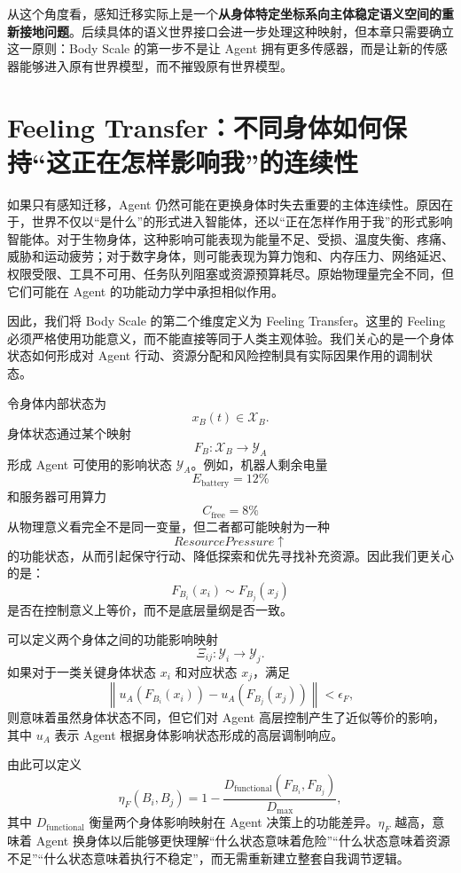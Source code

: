 从这个角度看，感知迁移实际上是一个\textbf{从身体特定坐标系向主体稳定语义空间的重新接地问题}。后续具体的语义世界接口会进一步处理这种映射，但本章只需要确立这一原则：Body Scale 的第一步不是让 Agent 拥有更多传感器，而是让新的传感器能够进入原有世界模型，而不摧毁原有世界模型。


\section{Feeling Transfer：不同身体如何保持“这正在怎样影响我”的连续性}

如果只有感知迁移，Agent 仍然可能在更换身体时失去重要的主体连续性。原因在于，世界不仅以“是什么”的形式进入智能体，还以“正在怎样作用于我”的形式影响智能体。对于生物身体，这种影响可能表现为能量不足、受损、温度失衡、疼痛、威胁和运动疲劳；对于数字身体，则可能表现为算力饱和、内存压力、网络延迟、权限受限、工具不可用、任务队列阻塞或资源预算耗尽。原始物理量完全不同，但它们可能在 Agent 的功能动力学中承担相似作用。

因此，我们将 Body Scale 的第二个维度定义为 Feeling Transfer。这里的 Feeling 必须严格使用功能意义，而不能直接等同于人类主观体验。我们关心的是一个身体状态如何形成对 Agent 行动、资源分配和风险控制具有实际因果作用的调制状态。

令身体内部状态为
\[
x_B(t)\in\mathcal X_B.
\]
身体状态通过某个映射
\[
F_B:
\mathcal X_B
\rightarrow
\mathcal Y_A
\]
形成 Agent 可使用的影响状态 $\mathcal Y_A$。例如，机器人剩余电量
\[
E_{\mathrm{battery}}=12\%
\]
和服务器可用算力
\[
C_{\mathrm{free}}=8\%
\]
从物理意义看完全不是同一变量，但二者都可能映射为一种
\[
ResourcePressure\uparrow
\]
的功能状态，从而引起保守行动、降低探索和优先寻找补充资源。因此我们更关心的是：
\[
F_{B_i}(x_i)
\sim
F_{B_j}(x_j)
\]
是否在控制意义上等价，而不是底层量纲是否一致。

可以定义两个身体之间的功能影响映射
\[
\Xi_{ij}:
\mathcal Y_i\rightarrow\mathcal Y_j.
\]
如果对于一类关键身体状态 $x_i$ 和对应状态 $x_j$，满足
\[
\left\|
u_A(F_{B_i}(x_i))
-
u_A(F_{B_j}(x_j))
\right\|
<
\epsilon_F,
\]
则意味着虽然身体状态不同，但它们对 Agent 高层控制产生了近似等价的影响，其中 $u_A$ 表示 Agent 根据身体影响状态形成的高层调制响应。

由此可以定义
\[
\eta_F(B_i,B_j)
=
1-
\frac{
D_{\mathrm{functional}}
(F_{B_i},F_{B_j})
}{
D_{\max}
},
\]
其中 $D_{\mathrm{functional}}$ 衡量两个身体影响映射在 Agent 决策上的功能差异。$\eta_F$ 越高，意味着 Agent 换身体以后能够更快理解“什么状态意味着危险”“什么状态意味着资源不足”“什么状态意味着执行不稳定”，而无需重新建立整套自我调节逻辑。

